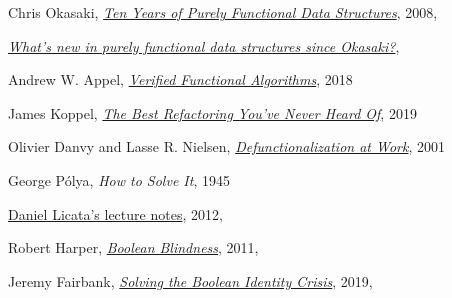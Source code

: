 \documentclass[declaration,mgr,english,shortabstract]{iithesis}
\begin{document}
\begin{thebibliography}{1}
    Chris Okasaki,
    \href{https://okasaki.blogspot.com/2008/02/ten-years-of-purely-functional-data.html}{\textit{Ten Years of Purely Functional Data Structures}}, 2008, \\

    \href{https://cstheory.stackexchange.com/questions/1539/whats-new-in-purely-functional-data-structures-since-okasaki}{\textit{What's new in purely functional data structures since Okasaki?}}, \\

    Andrew W. Appel,
    \href{https://softwarefoundations.cis.upenn.edu/vfa-current/index.html}{\textit{Verified Functional Algorithms}}, 2018

    James Koppel,
    \href{http://www.pathsensitive.com/2019/07/the-best-refactoring-youve-never-heard.html}{\textit{The Best Refactoring You've Never Heard Of}},
    2019

    Olivier Danvy and Lasse R. Nielsen,
    \href{https://www.brics.dk/RS/01/23/BRICS-RS-01-23.pdf}{\textit{Defunctionalization at Work}},
    2001

    George Pólya,
    \textit{How to Solve It},
    1945

    \href{https://www.cs.cmu.edu/~15150/previous-semesters/2012-spring/resources/lectures/09.pdf}{Daniel Licata's lecture notes},
    2012, \\

    Robert Harper,
    \href{https://existentialtype.wordpress.com/2011/03/15/boolean-blindness/}{\textit{Boolean Blindness}},
    2011, \\

    Jeremy Fairbank,
    \href{https://medium.com/swlh/solving-the-boolean-identity-crisis-33eeccde2c96}{\textit{Solving the Boolean Identity Crisis}},
    2019, \\


\end{thebibliography}
\end{document}
